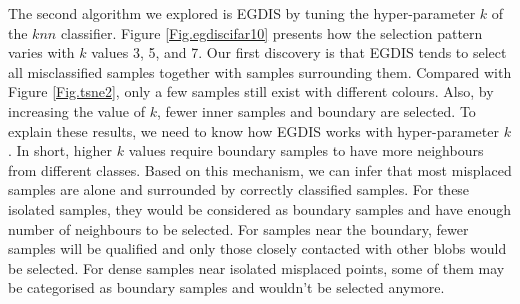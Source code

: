 The second algorithm we explored is EGDIS by tuning the hyper-parameter $k$ of the $knn$ classifier. Figure \ref{Fig.egdiscifar10} presents how the selection pattern varies with $k$ values 3, 5, and 7. Our first discovery is that EGDIS tends to select all misclassified samples together with samples surrounding them. Compared with Figure \ref{Fig.tsne2}, only a few samples still exist with different colours. Also, by increasing the value of $k$, fewer inner samples and boundary are selected. To explain these results, we need to know how EGDIS works with hyper-parameter $k$. In short, higher $k$ values require boundary samples to have more neighbours from different classes. Based on this mechanism, we can infer that most misplaced samples are alone and surrounded by correctly classified samples. For these isolated samples, they would be considered as boundary samples and have enough number of neighbours to be selected. For samples near the boundary, fewer samples will be qualified and only those closely contacted with other blobs would be selected. For dense samples near isolated misplaced points, some of them may be categorised as boundary samples and wouldn't be selected anymore.


